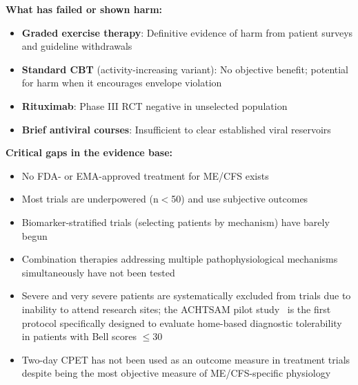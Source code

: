\textbf{What has failed or shown harm:}

\begin{itemize}
    \item \textbf{Graded exercise therapy}: Definitive evidence of harm from patient surveys and guideline withdrawals
    \item \textbf{Standard CBT} (activity-increasing variant): No objective benefit; potential for harm when it encourages envelope violation
    \item \textbf{Rituximab}: Phase III RCT negative in unselected population
    \item \textbf{Brief antiviral courses}: Insufficient to clear established viral reservoirs
\end{itemize}

\textbf{Critical gaps in the evidence base:}

\begin{itemize}
    \item No FDA- or EMA-approved treatment for ME/CFS exists
    \item Most trials are underpowered (n$<$50) and use subjective outcomes
    \item Biomarker-stratified trials (selecting patients by mechanism) have barely begun
    \item Combination therapies addressing multiple pathophysiological mechanisms simultaneously have not been tested
    \item Severe and very severe patients are systematically excluded from trials due to inability to attend research sites; the ACHTSAM pilot study~\cite{Fricke2026achtsam} is the first protocol specifically designed to evaluate home-based diagnostic tolerability in patients with Bell scores $\leq$30
    \item Two-day CPET has not been used as an outcome measure in treatment trials despite being the most objective measure of ME/CFS-specific physiology
\end{itemize}

